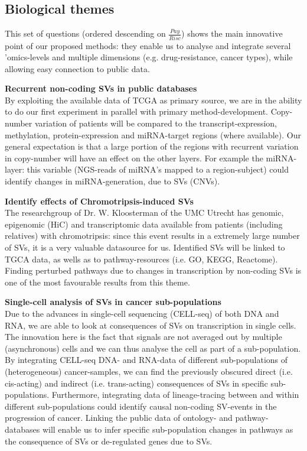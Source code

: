 \documentclass[twoside,fontsize=12pt]{article}
\begin{document}
\subsection*{Biological themes}

This set of questions (ordered descending on $\frac{Pay}{Risc}$) shows the main innovative point of our proposed methods: they enable us to analyse and integrate several 'omics-levels and multiple dimensions (e.g. drug-resistance, cancer types), while allowing easy connection to public data. 
\medskip

\noindent
\textbf{Recurrent non-coding SVs in public databases} \\
By exploiting the available data of TCGA as primary source, we are in the ability to do our first experiment in parallel with primary method-development. Copy-number variation of patients will be compared to the transcript-expression, methylation, protein-expression and miRNA-target regions (where available). Our general expectation is that a large portion of the regions with recurrent variation in copy-number will have an effect on the other layers. For example the miRNA-layer: this variable (NGS-reads of miRNA's mapped to a region-subject) could identify changes in miRNA-generation, due to SVs (CNVs).
\medskip

\noindent
\textbf{Identify effects of Chromotripsis-induced SVs} \\
The researchgroup of Dr. W. Kloosterman of the UMC Utrecht has genomic, epigenomic (HiC) and transcriptomic data available from patients (including relatives) with chromotripsis: since this event results in a extremely large number of SVs\cite{Kloosterman2014}, it is a very valuable datasource for us. Identified SVs will be linked to TGCA data, as wells as to pathway-resources (i.e. GO, KEGG, Reactome). Finding perturbed pathways due to changes in transcription by non-coding SVs is one of the most favourable results from this theme.
\medskip

\noindent
\textbf{Single-cell analysis of SVs in cancer sub-populations} \\
Due to the advances in single-cell sequencing (CELL-seq) of both DNA and RNA, we are able to look at consequences of SVs on transcription in single cells. The innovation here is the fact that signals are not averaged out by multiple (asynchronous) cells and we can thus analyse the cell as part of a sub-population. By integrating CELL-seq DNA- and RNA-data of different sub-populations of (heterogeneous) cancer-samples, we can find the previously obscured direct (i.e. cis-acting) and indirect (i.e. trans-acting) consequences of SVs in specific sub-populations. Furthermore, integrating data of lineage-tracing between and within different sub-populations could identify causal non-coding SV-events in the progression of cancer. Linking the public data of ontology- and pathway-databases will enable us to infer specific sub-population changes in pathways as the consequence of SVs or de-regulated genes due to SVs.
\end{document}
